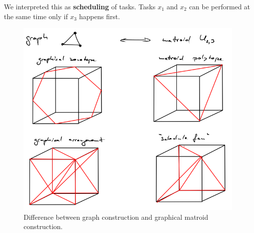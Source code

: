 \documentclass[11pt,letter]{amsart}
\begin{document}
We interpreted this as {\bf{scheduling}} of tasks.  Tasks $x_1$ and
$x_2$ can be performed  at the same time only if $x_3$ happens first.

\begin{figure}
\includegraphics[width=13cm]{graph-matroid}
\caption{Difference between graph construction and graphical matroid construction.}
\end{figure}
\end{document}
